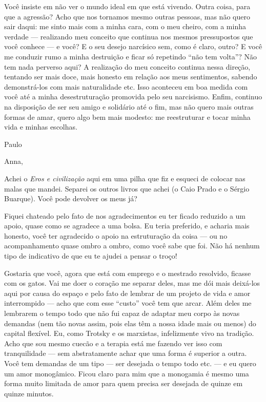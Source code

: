 Você insiste em não ver o mundo ideal em que está vivendo. Outra coisa,
para que a agressão? Acho que nos tornamos mesmo outras pessoas, mas não
quero sair daqui: me sinto mais com a minha cara, com o meu cheiro, com
a minha verdade --- realizando meu conceito que continua nos mesmos
pressupostos que você conhece --- e você? E o seu desejo narcísico sem,
como é claro, outro? E você me conduzir rumo a minha destruição e ficar
só repetindo ``não tem volta''? Não tem nada perverso aqui? A realização
do meu conceito continua nessa direção, tentando ser mais doce, mais
honesto em relação aos meus sentimentos, sabendo demonstrá-los com mais
naturalidade etc. Isso aconteceu em boa medida com você até a minha
desestruturação promovida pelo seu narcisismo. Enfim, continuo na
disposição de ser seu amigo e solidário até o fim, mas não quero mais
outras formas de amar, quero algo bem mais modesto: me reestruturar e
tocar minha vida e minhas escolhas.

\medskip{} 
\begin{flushright}Paulo\end{flushright}


\asterisc{}

Anna,

\medskip{} 

Achei o \emph{Eros e civilização} aqui em uma pilha que fiz e esqueci de
colocar nas malas que mandei. Separei os outros livros que achei (o Caio
Prado e o Sérgio Buarque). Você pode devolver os meus já?

Fiquei chateado pelo fato de nos agradecimentos eu ter ficado reduzido a
um apoio, quase como se agradece a uma bolsa. Eu teria preferido, e
acharia mais honesto, você ter agradecido o apoio na estruturação da
coisa --- ou no acompanhamento quase ombro a ombro, como você sabe que
foi. Não há nenhum tipo de indicativo de que eu te ajudei a pensar o
troço!

Gostaria que você, agora que está com emprego e o mestrado resolvido,
ficasse com os gatos. Vai me doer o coração me separar deles, mas me dói
mais deixá-los aqui por causa do espaço e pelo fato de lembrar de um
projeto de vida e amor interrompido --- acho que com esse ``custo'' você
tem que arcar. Além deles me lembrarem o tempo todo que não fui capaz de
adaptar meu corpo às novas demandas (nem tão novas assim, pois elas têm
a nossa idade mais ou menos) do capital flexível. Eu, como Trotsky e os
marxistas, infelizmente vivo na tradição. Acho que sou mesmo cuecão e a
terapia está me fazendo ver isso com tranquilidade --- sem abstratamente
achar que uma forma é superior a outra. Você tem demandas de um tipo ---
ser desejada o tempo todo etc. --- e eu quero um amor monogâmico. Ficou
claro para mim que a monogamia é mesmo uma forma muito limitada de amor
para quem precisa ser desejada de quinze em quinze minutos.

